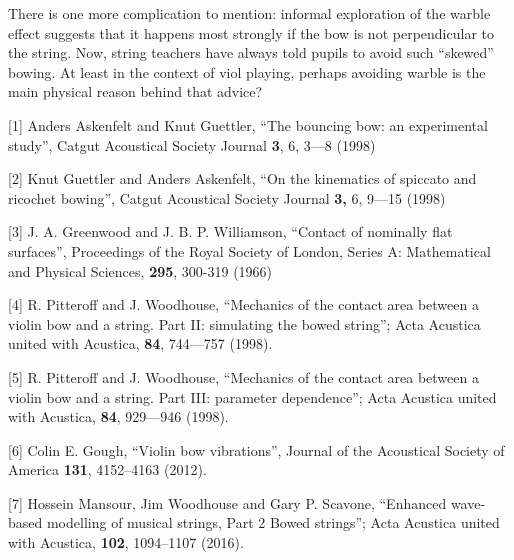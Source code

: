   There is one more complication to mention: informal exploration of the warble 
  effect suggests that it happens most strongly if the bow is not perpendicular 
  to the string. Now, string teachers have always told pupils to avoid such 
  “skewed” bowing. At least in the context of viol playing, perhaps avoiding 
  warble is the main physical reason behind that advice? 



  \sectionreferences{}[1] Anders Askenfelt and Knut Guettler, “The bouncing 
  bow: an experimental study”, Catgut Acoustical Society Journal \textbf{3}, 6, 
  3—8 (1998) 

  [2] Knut Guettler and Anders Askenfelt, “On the kinematics of spiccato and 
  ricochet bowing”, Catgut Acoustical Society Journal \textbf{3,} 6, 9—15 
  (1998) 

  [3] J. A. Greenwood and J. B. P. Williamson, “Contact of nominally flat 
  surfaces”, Proceedings of the Royal Society of London, Series A: Mathematical 
  and Physical Sciences, \textbf{295}, 300-319 (1966) 

  [4] R. Pitteroff and J. Woodhouse, “Mechanics of the contact area between a 
  violin bow and a string. Part II: simulating the bowed string”; Acta Acustica 
  united with Acustica, \textbf{84}, 744—757 (1998). 

  [5] R. Pitteroff and J. Woodhouse, “Mechanics of the contact area between a 
  violin bow and a string. Part III: parameter dependence”; Acta Acustica 
  united with Acustica, \textbf{84}, 929—946 (1998). 

  [6] Colin E. Gough, ``Violin bow vibrations'', Journal of the Acoustical 
  Society of America \textbf{131}, 4152--4163 (2012). 

  [7] Hossein Mansour, Jim Woodhouse and Gary P. Scavone, “Enhanced wave-based 
  modelling of musical strings, Part 2 Bowed strings”; Acta Acustica united 
  with Acustica, \textbf{102}, 1094–1107 (2016). 